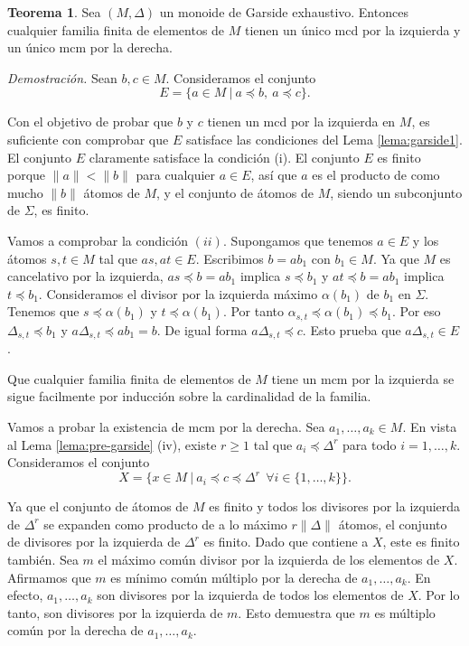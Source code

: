 \documentclass[12pt]{article}
\theoremstyle{definition}
\newtheorem{teor}{Teorema}[section]
\providecommand{\norm}[1]{\lVert#1\rVert}
\begin{document}
\begin{teor}
Sea $(M,\Delta)$ un monoide de Garside exhaustivo. Entonces cualquier familia finita de elementos de $M$ tienen un único mcd por la izquierda y un único mcm por la derecha.
\end{teor}
\textit{Demostración.} Sean $b,c\in M$. Consideramos el conjunto
$$E=\{a\in M\ |\ a\preceq b,\ a\preceq c\}.$$

Con el objetivo de probar que $b$ y $c$ tienen un mcd por la izquierda en $M$, es suficiente con comprobar que $E$ satisface las condiciones del Lema \ref{lema:garside1}. El conjunto $E$ claramente satisface la condición (i). El conjunto $E$ es finito porque $\norm{a}<\norm{b}$ para cualquier $a\in E$, así que $a$ es el producto de como mucho $\norm{b}$ átomos de $M$, y el conjunto de átomos de $M$, siendo un subconjunto de $\Sigma$, es finito.

Vamos a comprobar la condición $(ii)$. Supongamos que tenemos $a\in E$ y los átomos $s,t\in M$ tal que $as,at\in E$. Escribimos $b=ab_1$ con $b_1\in M$. Ya que $M$ es cancelativo por la izquierda, $as\preceq b =ab_1$ implica $s\preceq b_1$ y $at\preceq b = ab_1$ implica $t\preceq b_1$. Consideramos el divisor por la izquierda máximo $\alpha(b_1)$ de $b_1$ en $\Sigma$. Tenemos que $s\preceq\alpha(b_1)$ y $t\preceq\alpha(b_1)$. Por tanto $\alpha_{s,t}\preceq \alpha(b_1)\preceq b_1$. Por eso $\Delta_{s,t}\preceq b_1$ y $a\Delta_{s,t}\preceq ab_1= b$. De igual forma $a\Delta_{s,t}\preceq c$. Esto prueba que $a\Delta_{s,t}\in E$.

Que cualquier familia finita de elementos de $M$ tiene un mcm por la izquierda se sigue facilmente por inducción sobre la cardinalidad de la familia.

Vamos a probar la existencia de mcm por la derecha. Sea $a_1,\ldots,a_k\in M$. En vista al Lema \ref{lema:pre-garside} (iv), existe $r\geq 1$ tal que $a_i\preceq\Delta^r$ para todo $i=1,\ldots,k$. Consideramos el conjunto
$$X=\{x\in M\ |\ a_i\preceq c\preceq\Delta^r\ \ \forall i\in\{1,\ldots,k\}\}.$$

Ya que el conjunto de átomos de $M$ es finito y todos los divisores por la izquierda de $\Delta^r$ se expanden como producto de a lo máximo $r\norm{\Delta}$ átomos, el conjunto de divisores por la izquierda de $\Delta^r$ es finito. Dado que contiene a $X$, este es finito también. Sea $m$ el máximo común divisor por la izquierda de los elementos de $X$. Afirmamos que $m$ es mínimo común múltiplo por la derecha de $a_1,\ldots,a_k$. En efecto, $a_1,\ldots,a_k$ son divisores por la izquierda de todos los elementos de $X$. Por lo tanto, son divisores por la izquierda de $m$. Esto demuestra que $m$ es múltiplo común por la derecha de $a_1,\ldots,a_k$.
\end{document}
